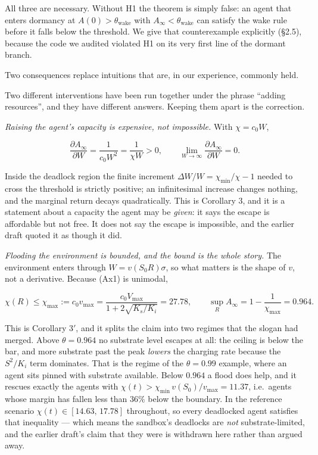 \documentclass[11pt,a4paper]{article}
\begin{document}
All three are necessary. Without H1 the theorem is simply false: an agent that
enters dormancy at \(A(0)>\theta_{\mathrm{wake}}\) with \(A_\infty<\theta_{\mathrm{wake}}\)
can satisfy the wake rule before it falls below the threshold. We give that
counterexample explicitly (§2.5), because the code we audited violated H1 on its
very first line of the dormant branch.

Two consequences replace intuitions that are, in our experience, commonly held.

Two different interventions have been run together under the phrase ``adding
resources'', and they have different answers. Keeping them apart is the correction.

\emph{Raising the agent's capacity is expensive, not impossible.} With \(\chi=c_0W\),

\[
\frac{\partial A_\infty}{\partial W}=\frac{1}{c_0W^2}=\frac{1}{\chi W}>0,
\qquad
\lim_{W\to\infty}\frac{\partial A_\infty}{\partial W}=0 .
\]

Inside the deadlock region the finite increment
\(\Delta W/W=\chi_{\min}/\chi-1\) needed to cross the threshold is strictly
positive; an infinitesimal increase changes nothing, and the marginal return decays
quadratically. This is Corollary 3, and it is a statement about a capacity the agent
may be \emph{given}: it says the escape is affordable but not free. It does not say the escape is
impossible, and the earlier draft quoted it as though it did.

\emph{Flooding the environment is bounded, and the bound is the whole story.} The
environment enters through \(W=v(S_0R)\sigma\), so what matters is the shape of \(v\),
not a derivative. Because (Ax1) is unimodal,

\[
\chi(R)\le\chi_{\max}:=c_0v_{\max}=\frac{c_0V_{\max}}{1+2\sqrt{K_s/K_i}}=27.78,
\qquad
\sup_R A_\infty=1-\frac{1}{\chi_{\max}}=0.964 .
\]

This is Corollary 3\('\), and it splits the claim into two regimes that the slogan
had merged. Above \(\theta=0.964\) no substrate level escapes at all: the ceiling is
below the bar, and more substrate past the peak \emph{lowers} the charging rate because
the \(S^2/K_i\) term dominates. That is the regime of the \(\theta=0.99\) example,
where an agent sits pinned with substrate available. Below \(0.964\) a flood does
help, and it rescues exactly the agents with
\(\chi(t)>\chi_{\min}\,v(S_0)/v_{\max}=11.37\), i.e.~agents whose margin has
fallen less than \(36\%\) below the boundary. In the reference scenario
\(\chi(t)\in[14.63,\,17.78]\) throughout, so every deadlocked agent satisfies that
inequality --- which means the sandbox's deadlocks are \emph{not} substrate-limited, and
the earlier draft's claim that they were is withdrawn here rather than argued away.
\end{document}
